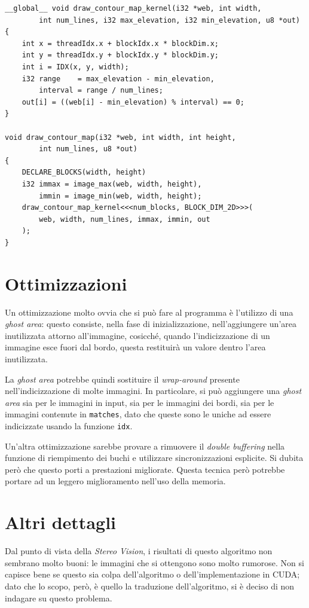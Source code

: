 \documentclass[12pt,a4paper,openright,twoside]{report}
\begin{document}
\begin{lstlisting}[style=mystyle]
__global__ void draw_contour_map_kernel(i32 *web, int width,
        int num_lines, i32 max_elevation, i32 min_elevation, u8 *out)
{
    int x = threadIdx.x + blockIdx.x * blockDim.x;
    int y = threadIdx.y + blockIdx.y * blockDim.y;
    int i = IDX(x, y, width);
    i32 range    = max_elevation - min_elevation,
        interval = range / num_lines;
    out[i] = ((web[i] - min_elevation) % interval) == 0;
}

void draw_contour_map(i32 *web, int width, int height,
        int num_lines, u8 *out)
{
    DECLARE_BLOCKS(width, height)
    i32 immax = image_max(web, width, height),
        immin = image_min(web, width, height);
    draw_contour_map_kernel<<<num_blocks, BLOCK_DIM_2D>>>(
        web, width, num_lines, immax, immin, out
    );
}
\end{lstlisting}

\section{Ottimizzazioni}

Un ottimizzazione molto ovvia che si può fare al programma è l'utilizzo di una \textit{ghost area}: questo consiste, nella fase di inizializzazione, nell'aggiungere un'area inutilizzata attorno all'immagine, cosicché, quando l'indicizzazione di un immagine esce fuori dal bordo, questa restituirà un valore dentro l'area inutilizzata.

La \textit{ghost area} potrebbe quindi sostituire il \textit{wrap-around} presente nell'indicizzazione di molte immagini. In particolare, si può aggiungere una \textit{ghost area} sia per le immagini in input, sia per le immagini dei bordi, sia per le immagini contenute in \verb|matches|, dato che queste sono le uniche ad essere indicizzate usando la funzione \verb|idx|.

Un'altra ottimizzazione sarebbe provare a rimuovere il \textit{double buffering} nella funzione di riempimento dei buchi e utilizzare sincronizzazioni esplicite. Si dubita però che questo porti a prestazioni migliorate. Questa tecnica però potrebbe portare ad un leggero miglioramento nell'uso della memoria.

\section{Altri dettagli}

Dal punto di vista della \textit{Stereo Vision}, i risultati di questo algoritmo non sembrano molto buoni: le immagini che si ottengono sono molto rumorose. Non si capisce bene se questo sia colpa dell'algoritmo o dell'implementazione in CUDA; dato che lo scopo, però, è quello la traduzione dell'algoritmo, si è deciso di non indagare su questo problema.
\end{document}
